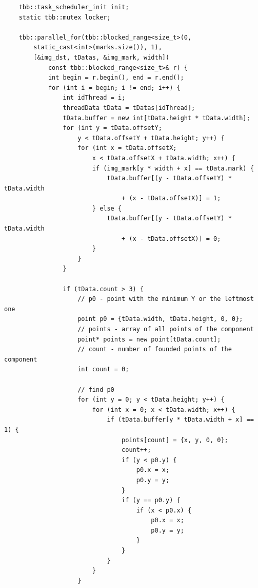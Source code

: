 \documentclass{report}
\begin{document}
\begin{lstlisting}
    tbb::task_scheduler_init init;
    static tbb::mutex locker;

    tbb::parallel_for(tbb::blocked_range<size_t>(0,
        static_cast<int>(marks.size()), 1),
        [&img_dst, tDatas, &img_mark, width](
            const tbb::blocked_range<size_t>& r) {
            int begin = r.begin(), end = r.end();
            for (int i = begin; i != end; i++) {
                int idThread = i;
                threadData tData = tDatas[idThread];
                tData.buffer = new int[tData.height * tData.width];
                for (int y = tData.offsetY;
                    y < tData.offsetY + tData.height; y++) {
                    for (int x = tData.offsetX;
                        x < tData.offsetX + tData.width; x++) {
                        if (img_mark[y * width + x] == tData.mark) {
                            tData.buffer[(y - tData.offsetY) * tData.width
                                + (x - tData.offsetX)] = 1;
                        } else {
                            tData.buffer[(y - tData.offsetY) * tData.width
                                + (x - tData.offsetX)] = 0;
                        }
                    }
                }

                if (tData.count > 3) {
                    // p0 - point with the minimum Y or the leftmost one
                    point p0 = {tData.width, tData.height, 0, 0};
                    // points - array of all points of the component
                    point* points = new point[tData.count];
                    // count - number of founded points of the component
                    int count = 0;

                    // find p0
                    for (int y = 0; y < tData.height; y++) {
                        for (int x = 0; x < tData.width; x++) {
                            if (tData.buffer[y * tData.width + x] == 1) {
                                points[count] = {x, y, 0, 0};
                                count++;
                                if (y < p0.y) {
                                    p0.x = x;
                                    p0.y = y;
                                }
                                if (y == p0.y) {
                                    if (x < p0.x) {
                                        p0.x = x;
                                        p0.y = y;
                                    }
                                }
                            }
                        }
                    }


\end{lstlisting}
\end{document}
